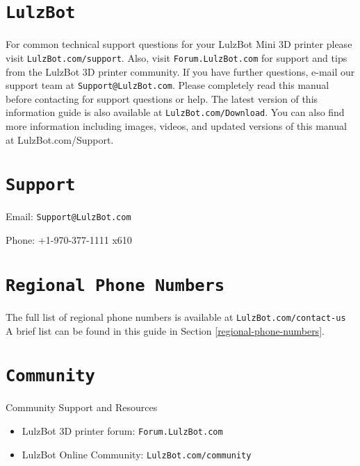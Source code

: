 %
%
%
%
%

\section{\texttt{LulzBot}}
\setlength{\parindent}{0pt}
For common technical support questions for your LulzBot\textsuperscript{\miniscule{\textregistered}} Mini 3D printer please visit \texttt{LulzBot.com/support}. Also, visit \texttt{Forum.LulzBot.com} for support and tips from the LulzBot 3D printer community. If you have further questions, e-mail our support team at \texttt{Support@LulzBot.com}. Please completely read this manual before contacting for support questions or help. The latest version of this information guide is also available at \texttt{LulzBot.com/Download}. You can also find more information including images, videos, and updated versions of this manual at LulzBot.com/Support.

\section{\texttt{Support}}
\setlength{\parindent}{0pt}
Email: \texttt{Support@LulzBot.com}

Phone: +1-970-377-1111 x610

\section{\texttt{Regional Phone Numbers}}
The full list of regional phone numbers is available at \texttt{LulzBot.com/contact-us} A brief list can be found in this guide in Section \ref{regional-phone-numbers}.

\section{\texttt{Community}}
Community Support and Resources

\begin{itemize}

\item LulzBot 3D printer forum: \texttt{Forum.LulzBot.com}
\item LulzBot Online Community: \texttt{LulzBot.com/community}

\end{itemize}
